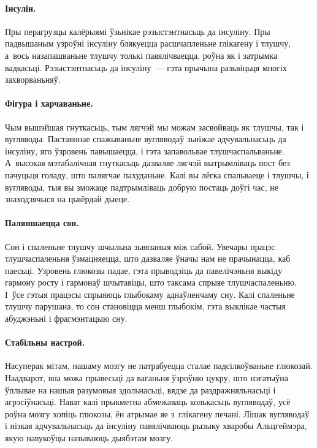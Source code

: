 
\paragraph{Інсулін.}
Пры перагрузцы калёрыямі ўзьнікае рэзыстэнтнасьць да інсуліну. Пры падвышаным узроўні інсуліну блякуецца расшчапленьне глікагену і тлушчу, а~вось назапашваньне тлушчу толькі павялічваецца, роўна як і затрымка вадкасьці. Рэзыстэнтнасьць да інсуліну~--- гэта прычына разьвіцьця многіх захворваньняў.

\paragraph{Фігура і харчаваньне.}
Чым вышэйшая гнуткасьць, тым лягчэй мы можам засвойваць як тлушчы, так і вугляводы. Пастаяннае спажываньне вугляводаў зьніжае адчувальнасьць да інсуліну, яго ўзровень павышаецца, і гэта запавольвае тлушчаспальваньне. А~высокая мэтабалічная гнуткасьць дазваляе лягчэй вытрымліваць пост без пачуцьця голаду, што палягчае пахуданьне. Калі вы лёгка спальваеце і тлушчы, і вугляводы, тыя вы зможаце падтрымліваць добрую постаць доўгі час, не знаходзячыся на цьвёрдай дыеце.

\paragraph{Паляпшаецца сон.}
Сон і спаленьне тлушчу шчыльна зьвязаныя між сабой. Увечары працэс тлушчаспаленьня ўзмацняецца, што дазваляе ўначы нам не прачынацца, каб паесьці. Узровень глюкозы падае, гэта прыводзіць да павелічэньня выкіду гармону росту і гармонаў шчытавіцы, што таксама спрыяе тлушчаспаленьню. І~ўсе гэтыя працэсы спрыяюць глыбокаму аднаўленчаму сну. Калі спаленьне тлушчу парушана, то сон становіцца менш глыбокім, гэта выклікае частыя абуджэньні і фрагмэнтацыю сну.

\paragraph{Стабільны настрой.}
Насуперак мітам, нашаму мозгу не патрабуецца сталае падсілкоўваньне глюкозай. Наадварот, яна можа прывесьці да ваганьня ўзроўню цукру, што нэгатыўна ўплывае на нашыя разумовыя здольнасьці, вядзе да раздражняльнасьці і агрэсіўнасьці. Нават калі прыкметна абмежаваць колькасьць вугляводаў, усё роўна мозгу хопіць глюкозы, ён атрымае яе з~глікагену печані. Лішак вугляводаў і нізкая адчувальнасьць да інсуліну павялічваюць рызыку хваробы Альцгеймэра, якую навукоўцы называюць дыябэтам мозгу.

